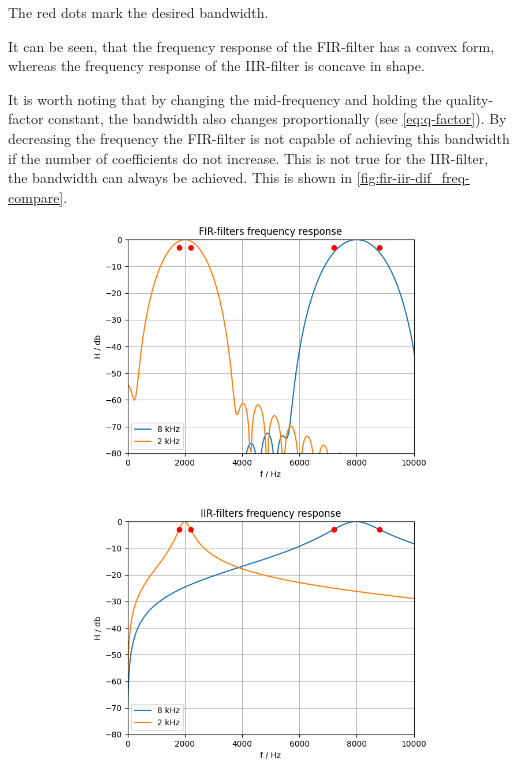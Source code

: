 The red dots mark the desired bandwidth.

It can be seen, that the frequency response of the \ac{FIR}-filter has a convex form, whereas the frequency response
of the \ac{IIR}-filter is concave in shape.

It is worth noting that by changing the mid-frequency and holding the quality-factor constant, the bandwidth also
changes proportionally (see \autoref{eq:q-factor}). By decreasing the frequency the \ac{FIR}-filter is not capable
of achieving this bandwidth if the number of coefficients do not increase. This is not true for the \ac{IIR}-filter,
the bandwidth can always be achieved. This is shown in \autoref{fig:fir-iir-dif_freq-compare}.

\begin{figure}[!h]
    \centering
    \begin{subfigure}[c]{0.49\textwidth}
        \centering
        \includegraphics[width=\textwidth]{img/fir_bandpass_compare.png}
    \end{subfigure}
    \begin{subfigure}[c]{0.49\textwidth}
        \centering
        \includegraphics[width=\textwidth]{img/iir_bandpass_compare.png}

\end{subfigure}
\end{figure}
